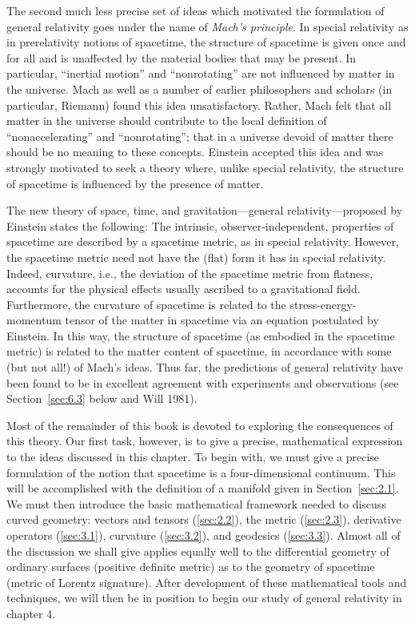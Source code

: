 The second much less precise set of ideas which motivated the formulation of general
relativity goes under the name of \emph{Mach's principle}. In special relativity as in
prerelativity notions of spacetime, the structure of spacetime is given once and for all
and is unaffected by the material bodies that may be present. In particular, ``inertial
motion'' and ``nonrotating'' are not influenced by matter in the universe. Mach as well
as a number of earlier philosophers and scholars (in particular, Riemann) found this
idea unsatisfactory. Rather, Mach felt that all matter in the universe should contribute
to the local definition of ``nonaccelerating'' and ``nonrotating''; that in a universe
devoid of matter there should be no meaning to these concepts. Einstein accepted this
idea and was strongly motivated to seek a theory where, unlike special relativity, the
structure of spacetime is influenced by the presence of matter.

The new theory of space, time, and gravitation---general relativity---proposed by
Einstein states the following: The intrinsic, observer-independent, properties of
spacetime are described by a spacetime metric, as in special relativity. However, the
spacetime metric need not have the (flat) form it has in special relativity. Indeed,
curvature, i.e., the deviation of the spacetime metric from flatness, accounts for the
physical effects usually ascribed to a gravitational field. Furthermore, the curvature
of spacetime is related to the stress-energy-momentum tensor of the matter in spacetime
via an equation postulated by Einstein. In this way, the structure of spacetime (as
embodied in the spacetime metric) is related to the matter content of spacetime, in
accordance with some (but not all!) of Mach's ideas. Thus far, the predictions of
general relativity have been found to be in excellent agreement with experiments and
observations (see Section~\ref{sec:6.3} below and Will 1981).

Most of the remainder of this book is devoted to exploring the consequences of this
theory. Our first task, however, is to give a precise, mathematical expression to the
ideas discussed in this chapter. To begin with, we must give a precise formulation of
the notion that spacetime is a four-dimensional continuum. This will be accomplished
with the definition of a manifold given in Section~\ref{sec:2.1}. We must then
introduce the basic mathematical framework needed to discuss curved geometry: vectors
and tensors (\ref{sec:2.2}), the metric (\ref{sec:2.3}), derivative operators
(\ref{sec:3.1}), curvature (\ref{sec:3.2}), and geodesics (\ref{sec:3.3}). Almost all
of the discussion we shall give applies equally well to the differential geometry of
ordinary surfaces (positive definite metric) as to the geometry of spacetime (metric
of Lorentz signature). After development of these mathematical tools and techniques,
we will then be in position to begin our study of general relativity in chapter 4.
